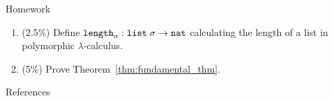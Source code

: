 %
%
%
%
%
%
%
\begin{frame}{Homework}
  \begin{enumerate}
    \item (2.5\%) Define $\mathtt{length}_\sigma : \mathtt{list}\;\sigma \to \mathtt{nat}$ calculating the length of a list in polymorphic $\lambda$-calculus.
    \item (5\%) Prove Theorem~\ref{thm:fundamental_thm}.
  \end{enumerate}
  
\end{frame}

\begin{frame}[allowframebreaks]{References}
  
   
\end{frame}



